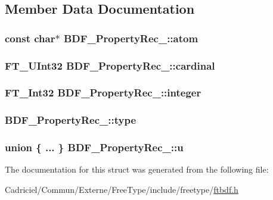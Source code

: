 \subsection{Member Data Documentation}
\hypertarget{struct_b_d_f___property_rec___aa8d56dc848d8a2c8e2f7e40a63f5d032}{
\subsubsection[{atom}]{\setlength{\rightskip}{0pt plus 5cm}const char$\ast$ B\-D\-F\-\_\-\-Property\-Rec\-\_\-\-::atom}}\label{struct_b_d_f___property_rec___aa8d56dc848d8a2c8e2f7e40a63f5d032}
\hypertarget{struct_b_d_f___property_rec___adaba2e4ce8da90a5ea59080a0521d332}{
\subsubsection[{cardinal}]{\setlength{\rightskip}{0pt plus 5cm}F\-T\-\_\-\-U\-Int32 B\-D\-F\-\_\-\-Property\-Rec\-\_\-\-::cardinal}}\label{struct_b_d_f___property_rec___adaba2e4ce8da90a5ea59080a0521d332}
\hypertarget{struct_b_d_f___property_rec___a71243b414ad203fd7d6d2468c39bbd79}{
\subsubsection[{integer}]{\setlength{\rightskip}{0pt plus 5cm}F\-T\-\_\-\-Int32 B\-D\-F\-\_\-\-Property\-Rec\-\_\-\-::integer}}\label{struct_b_d_f___property_rec___a71243b414ad203fd7d6d2468c39bbd79}
\hypertarget{struct_b_d_f___property_rec___a88c19ee6f16bd1b36127f5f7d44a4e39}{
\subsubsection[{type}]{ B\-D\-F\-\_\-\-Property\-Rec\-\_\-\-::type}}\label{struct_b_d_f___property_rec___a88c19ee6f16bd1b36127f5f7d44a4e39}
\hypertarget{struct_b_d_f___property_rec___a7fdd16635fbcfd4f737e6beb2d014871}{
\subsubsection[{u}]{\setlength{\rightskip}{0pt plus 5cm}union \{ ... \}   B\-D\-F\-\_\-\-Property\-Rec\-\_\-\-::u}}\label{struct_b_d_f___property_rec___a7fdd16635fbcfd4f737e6beb2d014871}


The documentation for this struct was generated from the following file\-:\begin{DoxyCompactItemize}
\item 
Cadriciel/\-Commun/\-Externe/\-Free\-Type/include/freetype/\hyperlink{ftbdf_8h}{ftbdf.\-h}\end{DoxyCompactItemize}
